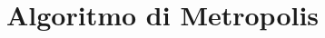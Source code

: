 \documentclass[\main/main.tex]{subfiles}
\begin{document}
\section{Algoritmo di Metropolis}
\end{document}
